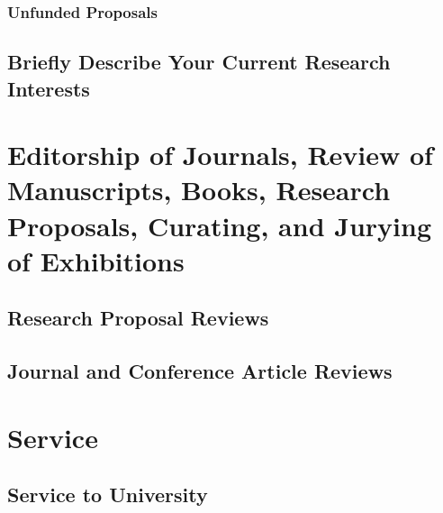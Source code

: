 \documentclass[11 pt]{rpibio}
\begin{document}
\subsubsection{Unfunded Proposals}
\begin{refcontext}[labelprefix=PU]
  \printbibliography[filter=unfunded_proposal, notkeyword=inkind, block=nbpar, heading=none,resetnumbers=true]
\end{refcontext} 

\begin{refcontext}[labelprefix=PUIK]
  \printbibliography[filter=unfunded_proposal, keyword=inkind, block=nbpar, heading=none,resetnumbers=true]
\end{refcontext} 

\subsection{Briefly Describe Your Current Research Interests}



\section{Editorship of Journals, Review of Manuscripts, Books, Research Proposals, Curating, and Jurying of Exhibitions}

%


\subsection{Research Proposal Reviews}


\subsection{Journal and Conference Article Reviews}



\section{Service}

\subsection{Service to University}

\end{document}
